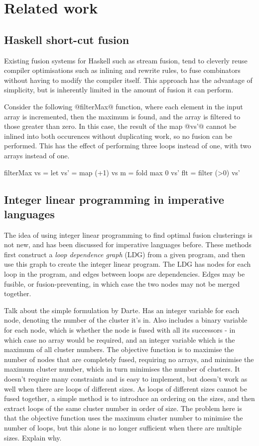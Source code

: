 \section{Related work}

\subsection{Haskell short-cut fusion}
Existing fusion systems for Haskell such as stream fusion\cite{coutts2007streamfusion}, tend to cleverly reuse compiler optimisations such as inlining and rewrite rules, to fuse combinators without having to modify the compiler itself.
This approach has the advantage of simplicity, but is inherently limited in the amount of fusion it can perform.

Consider the following @filterMax@ function, where each element in the input array is incremented, then the maximum is found, and the array is filtered to those greater than zero.
In this case, the result of the map @vs'@ cannot be inlined into both occurences without duplicating work, so no fusion can be performed.
This has the effect of performing three loops instead of one, with two arrays instead of one.

\begin{code}
filterMax vs =
 let vs' = map    (+1)  vs
     m   = fold   max 0 vs'
     flt = filter (>0)  vs'
\end{code}

\subsection{Integer linear programming in imperative languages}
The idea of using integer linear programming to find optimal fusion clusterings is not new, and has been discussed for imperative languages before.
These methods first construct a \emph{loop dependence graph} (LDG) from a given program, and then use this graph to create the integer linear program.
The LDG has nodes for each loop in the program, and edges between loops are dependencies.
Edges may be fusible, or fusion-preventing, in which case the two nodes may not be merged together.

Talk about the simple formulation by Darte\cite{darte2002new}.
Has an integer variable for each node, denoting the number of the cluster it's in.
Also includes a binary variable for each node, which is whether the node is fused with all its successors - in which case no array would be required, and an integer variable which is the maximum of all cluster numbers.
The objective function is to maximise the number of nodes that are completely fused, requiring no arrays, and minimise the maximum cluster number, which in turn minimises the number of clusters.
It doesn't require many constraints and is easy to implement, but doesn't work as well when there are loops of different sizes.
As loops of different sizes cannot be fused together, a simple method is to introduce an ordering on the sizes, and then extract loops of the same cluster number in order of size.
The problem here is that the objective function uses the maximum cluster number to minimise the number of loops, but this alone is no longer sufficient when there are multiple sizes. Explain why.


